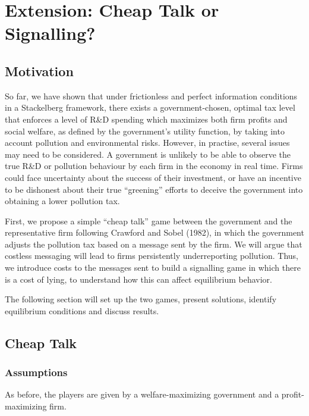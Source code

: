 \documentclass{article}
\begin{document}
\section{Extension: Cheap Talk or Signalling?}
\subsection{Motivation}
So far, we have shown that under frictionless and perfect information conditions in a Stackelberg framework, there exists a government-chosen, optimal tax level that enforces a level of R\&D spending which maximizes both firm profits and social welfare, as defined by the government's utility function, by taking into account pollution and environmental risks.
However, in practise, several issues may need to be considered. A government is unlikely to be able to observe the true R\&D or pollution behaviour by each firm in the economy in real time.
Firms could face uncertainty about the success of their investment, or have an incentive to be dishonest about their true “greening” efforts to deceive the government into obtaining a lower pollution tax.

First, we propose a simple “cheap talk” game between the government and the representative firm following Crawford and Sobel (1982), in which the government adjusts the pollution tax based on a message sent by the firm. We will argue that costless messaging will lead to firms persistently underreporting pollution. Thus, we introduce costs to the messages sent to build a signalling game in which there is a cost of lying, to understand how this can affect equilibrium behavior. 

The following section will set up the two games, present solutions, identify equilibrium conditions and discuss results.

\subsection{Cheap Talk}

\subsubsection{Assumptions}

As before, the players are given by a welfare-maximizing government and a profit-maximizing firm. 
\end{document}
